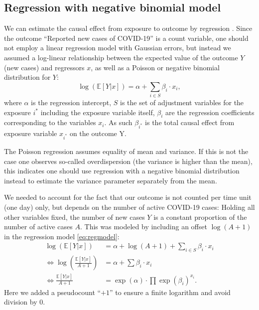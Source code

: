\documentclass[]{elsarticle} %
\begin{document}
\hypertarget{regression-with-negative-binomial-model}{%
\subsection{Regression with negative binomial model}\label{regression-with-negative-binomial-model}}

We can estimate the causal effect from exposure to outcome by regression \citep{pearl2009causality}. Since the outcome ``Reported new cases of COVID-19'' is a count variable, one should not employ a linear regression model with Gaussian errors, but instead we assumed a log-linear relationship between the expected value of the outcome \(Y\) (new cases) and regressors \(x\), as well as a Poisson or negative binomial distribution for \(Y\):
\begin{equation}
\log(\mathbb{E}[Y|x]) = \alpha + \sum_{i\in S}\beta_i\cdot x_{i}, \label{eq:regmodel}
\end{equation}
where \(\alpha\) is the regression intercept, \(S\) is the set of adjustment variables for the exposure \(i^{\ast}\) including the exposure variable itself, \(\beta_i\) are the regression coefficients corresponding to the variables \(x_i\). As such \(\beta_{i^{\ast}}\) is the total causal effect from exposure variable \(x_{i^{\ast}}\) on the outcome Y.

The Poisson regression assumes equality of mean and variance. If this is not the case one observes so-called overdispersion (the variance is higher than the mean), this indicates one should use regression with a negative binomial distribution instead to estimate the variance parameter separately from the mean.

We needed to account for the fact that our outcome is not counted per time unit (one day) only, but depends on the number of active COVID-19 cases: Holding all other variables fixed, the number of new cases \(Y\) is a constant proportion of the number of active cases \(A\). This was modeled by including an offset \(\log(A+1)\) in the regression model \eqref{eq:regmodel}:
\begin{align}
\log(\mathbb{E}[Y|x]) &= \alpha + \log(A+1) + \sum_{i\in S}\beta_i\cdot x_{i} \nonumber \\
\Leftrightarrow \log(\frac{\mathbb{E}[Y|x]}{A+1}) &= \alpha + \sum\beta_i\cdot x_{i} \label{eq:logratemodel} \\
\Leftrightarrow \frac{\mathbb{E}[Y|x]}{A+1} &= \exp(\alpha)\cdot \prod \exp(\beta_i)^{x_i}. \label{eq:ratechange}
\end{align}
Here we added a pseudocount ``\(+1\)'' to ensure a finite logarithm and avoid division by \(0\).
\end{document}
